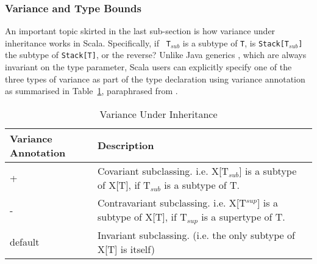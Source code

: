 \begin{comment}
  \begin{lstlisting}[language=scala, escapechar=?]
object Client extends App {
  val stack:Stack[Integer] = new ArrayStack[Integer]  
  var i = 0
  for(i <- 0 until 4) stack.push(?\textcolor{blue}{ new Integer(i)}?)
  assert(stack.toString().equals("stack(3, 2, 1, 0)"))
  val top = stack.pop
  assert(top == 3 && stack.toString().equals("stack(2, 1, 0)"))
  val reverse = Stacks.reverse(stack)
  assert(stack.empty)
  assert(reverse.toString().equals("stack(0, 1, 2)"))
}
  \end{lstlisting}  
    
  \caption{Scala Example: A Generic Stack Library using Type Bounds}
  \label{scala_generic_bound_example}
\end{figure}

The remaining code in Figure~\ref{scala_generic_bound_example} is the same as 
the code in Figure~\ref{scala_generic_example} except that, on line 4 of the 
{\tt Client} example, the value of {\tt i} need to be explicitly converted to an 
{\tt Integer}.

\end{comment}
\subsubsection{Variance and Type Bounds}

An important topic skirted in the last sub-section
is how variance under inheritance works in Scala.   Specifically, if {\tt 
T$_{sub}$} is a subtype of {\tt T}, is {\tt Stack[T$_{sub}$]} the subtype of 
{\tt Stack[T]}, or the reverse?  Unlike Java generics \citep{JGC}, 
which are always invariant on the type parameter, Scala users can explicitly 
specify one of the three types of variance as part of the type declaration 
using variance annotation as summarised in Table~\ref{scala_variance}, 
paraphrased from \citep[Table 12.1]{scala_book}.

\begin{table}[h]
\begin{tabular}{| l | p{3.8 in} |}
\hline  
Variance Annotation & Description\\
\hline  
+  & Covariant subclassing. i.e. X[T$_{sub}$] is a subtype of X[T], if T$_{sub}$ is a subtype of T.\\
\hline  
-  & Contravariant subclassing. i.e. X[T$^{sup}$] is a subtype of X[T], if T$_{sup}$ is a supertype of T. \\
\hline  
default  & Invariant subclassing. (i.e. the only subtype of X[T] is itself)\\
\hline  
 
\end{tabular}
\caption{Variance Under Inheritance}
\label{scala_variance}
\end{table}





